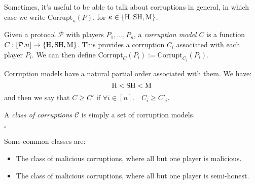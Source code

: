 Sometimes, it's useful to be able to talk about corruptions in general,
in which case we write $\text{Corrupt}_\kappa(P)$,
for $\kappa \in \{\text{H}, \text{SH}, \text{M}\}$.

\begin{definition}
Given a protocol $\mathcal{P}$ with players $P_1, \ldots, P_n$, a \emph{corruption model} $C$
is a function $C : [\mathcal{P}.n] \to \{\text{H}, \text{SH}, \text{M}\}$.
This provides a corruption $C_i$ associated with each player $P_i$.
We can then define $\text{Corrupt}_C(P_i) := \text{Corrupt}_{C_i}(P_i)$.

Corruption models have a natural partial order associated with them. 
We have:
$$
\text{H} < \text{SH} < \text{M}
$$
  and then we say that $C \geq C'$ if $\forall i \in [n]. \quad C_i \geq C'_i$.

A \emph{class of corruptions} $\mathcal{C}$ is simply a set of corruption models.

$\square$
\end{definition}

Some common classes are:
\begin{itemize}
  \item The class of malicious corruptions, where all but one player is malicious.
  \item The class of malicious corruptions, where all but one player is semi-honest.
\end{itemize}

